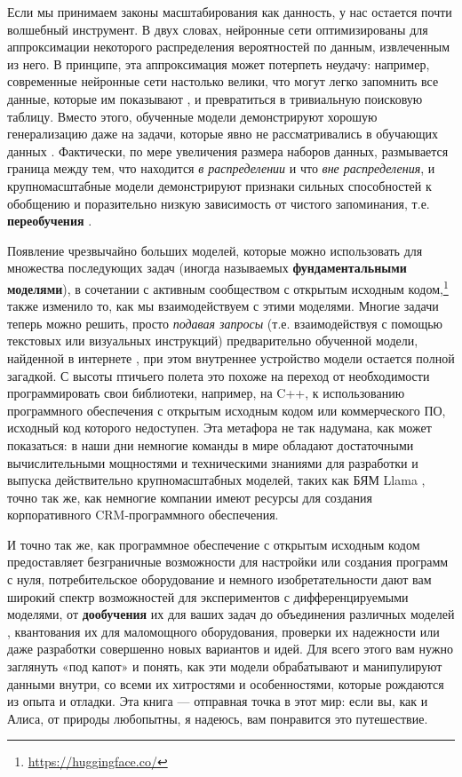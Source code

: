 Если мы принимаем законы масштабирования как данность, у нас остается почти волшебный инструмент. В двух словах, нейронные сети оптимизированы для аппроксимации некоторого распределения вероятностей по данным, извлеченным из него. В принципе, эта аппроксимация может потерпеть неудачу: например, современные нейронные сети настолько велики, что могут легко запомнить все данные, которые им показывают \cite{zhang2021understanding}, и превратиться в тривиальную поисковую таблицу. Вместо этого, обученные модели демонстрируют хорошую генерализацию даже на задачи, которые явно не рассматривались в обучающих данных \cite{akyurek2022learning}. Фактически, по мере увеличения размера наборов данных, размывается граница между тем, что находится \textit{в распределении} и что \textit{вне распределения}, и крупномасштабные модели демонстрируют признаки сильных способностей к обобщению и поразительно низкую зависимость от чистого запоминания, т.е. \textbf{переобучения} \cite{power2022grokking}.

Появление чрезвычайно больших моделей, которые можно использовать для множества последующих задач (иногда называемых \textbf{фундаментальными моделями}), в сочетании с активным сообществом с открытым исходным кодом,\footnote{\url{https://huggingface.co/}} также изменило то, как мы взаимодействуем с этими моделями. Многие задачи теперь можно решить, просто \textit{подавая запросы} (т.е. взаимодействуя с помощью текстовых или визуальных инструкций) предварительно обученной модели, найденной в интернете \cite{akyurek2022learning}, при этом внутреннее устройство модели остается полной загадкой. С высоты птичьего полета это похоже на переход от необходимости программировать свои библиотеки, например, на C++, к использованию программного обеспечения с открытым исходным кодом или коммерческого ПО, исходный код которого недоступен. Эта метафора не так надумана, как может показаться: в наши дни немногие команды в мире обладают достаточными вычислительными мощностями и техническими знаниями для разработки и выпуска действительно крупномасштабных моделей, таких как БЯМ Llama \cite{touvron2023llama}, точно так же, как немногие компании имеют ресурсы для создания корпоративного CRM-программного обеспечения.

И точно так же, как программное обеспечение с открытым исходным кодом предоставляет безграничные возможности для настройки или создания программ с нуля, потребительское оборудование и немного изобретательности дают вам широкий спектр возможностей для экспериментов с дифференцируемыми моделями, от \textbf{дообучения} их для ваших задач \cite{liu2022few} до объединения различных моделей \cite{ainsworth2022git}, квантования их для маломощного оборудования, проверки их надежности или даже разработки совершенно новых вариантов и идей. Для всего этого вам нужно заглянуть «под капот» и понять, как эти модели обрабатывают и манипулируют данными внутри, со всеми их хитростями и особенностями, которые рождаются из опыта и отладки. Эта книга — отправная точка в этот мир: если вы, как и Алиса, от природы любопытны, я надеюсь, вам понравится это путешествие.

